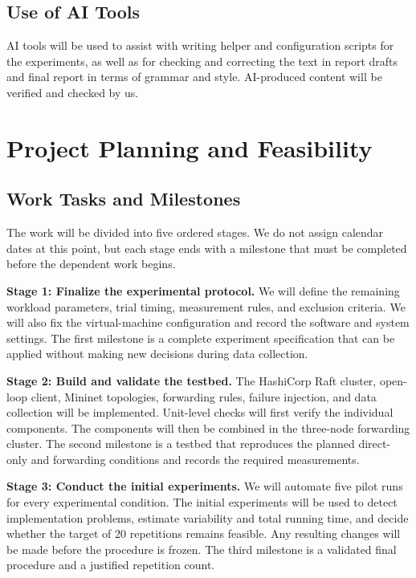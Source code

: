 \documentclass[11pt,a4paper]{article}
\begin{document}
\subsection{Use of AI Tools}
AI tools will be used to assist with writing helper and configuration scripts for the experiments, as well as for checking and correcting the text in report drafts and final report in terms of grammar and style.
AI-produced content will be verified and checked by us.

\section{Project Planning and Feasibility}

\subsection{Work Tasks and Milestones}

The work will be divided into five ordered stages. We do not assign calendar dates at this point, but each stage ends with a milestone that must be completed before the dependent work begins.

\textbf{Stage 1: Finalize the experimental protocol.}
We will define the remaining workload parameters, trial timing, measurement rules, and exclusion criteria. We will also fix the virtual-machine configuration and record the software and system settings. The first milestone is a complete experiment specification that can be applied without making new decisions during data collection.

\textbf{Stage 2: Build and validate the testbed.}
The HashiCorp Raft cluster, open-loop client, Mininet topologies, forwarding rules, failure injection, and data collection will be implemented. Unit-level checks will first verify the individual components. The components will then be combined in the three-node forwarding cluster. The second milestone is a testbed that reproduces the planned direct-only and forwarding conditions and records the required measurements.

\textbf{Stage 3: Conduct the initial experiments.}
We will automate five pilot runs for every experimental condition. The initial experiments will be used to detect implementation problems, estimate variability and total running time, and decide whether the target of 20 repetitions remains feasible. Any resulting changes will be made before the procedure is frozen. The third milestone is a validated final procedure and a justified repetition count.
\end{document}
